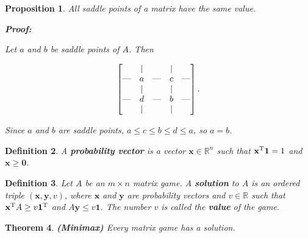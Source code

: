 \documentclass{article}
\theoremstyle{colontheorem}
\newtheorem{theorem}{Theorem}[section]
\newtheorem{proposition}[theorem]{Proposition}
\newtheorem{definition}[theorem]{Definition}
\newcommand{\T}{^\textnormal{T}}
\newenvironment{Theorem}
{
	\begin{mdframed}[backgroundcolor=TheoremOrange!10]
	\begin{theorem}
}
{
	\end{theorem}
	\end{mdframed}
	
	\vspace{.15in}
}
\newenvironment{Proposition}
{
	\begin{mdframed}[backgroundcolor=PropPink!10]
	\begin{proposition}
}
{
	\end{proposition}
	\end{mdframed}
	
	\vspace{.15in}
}
\newenvironment{Def}
{
	\begin{mdframed}[backgroundcolor=DefGreen!10]
	\begin{definition}
}
{
	\end{definition}
	\end{mdframed}
	
	\vspace{.15in}
}
\newenvironment{Proof}
{
	\begin{mdframed}[backgroundcolor=ProofPurple!10]
	\textbf{Proof:}%
}
{
	\end{mdframed}
	
	\vspace{.085in}
}
\begin{document}
\begin{Proposition}
	
	All saddle points of a matrix have the same value.
	
	\begin{Proof}
		Let $a$ and $b$ be saddle points of $A$. Then
		
		$$
		\begin{bmatrix}
		
		& | & & | &\\
		\textnormal{---} & a & \textnormal{---} & c & \textnormal{---}\\
		& | & & | &\\
		\textnormal{---} & d & \textnormal{---} & b & \textnormal{---}\\
		& | & & | &\\
		
		\end{bmatrix}.
		$$
		
		Since $a$ and $b$ are saddle points, $a \leq c \leq b \leq d \leq a$, so $a = b$.
		
	\end{Proof}
	
\end{Proposition}



\begin{Def}
	
	A \textbf{probability vector} is a vector $\mathbf{x} \in \mathbb{R}^n$ such that $\mathbf{x}\T \mathbf{1} = 1$ and $\mathbf{x} \geq \mathbf{0}$.
	
\end{Def}



\begin{Def}
	
	Let $A$ be an $m \times n$ matrix game. A \textbf{solution} to $A$ is an ordered triple $(\mathbf{x}, \mathbf{y}, v)$, where $\mathbf{x}$ and $\mathbf{y}$ are probability vectors and $v \in \mathbb{R}$ such that $\mathbf{x}\T A \geq v \mathbf{1}\T$ and $A \mathbf{y} \leq v \mathbf{1}$. The number $v$ is called the \textbf{value} of the game.
	
\end{Def}



\begin{Theorem}
	
	\textbf{(Minimax)} Every matrix game has a solution.
	
\end{Theorem}
\end{document}

